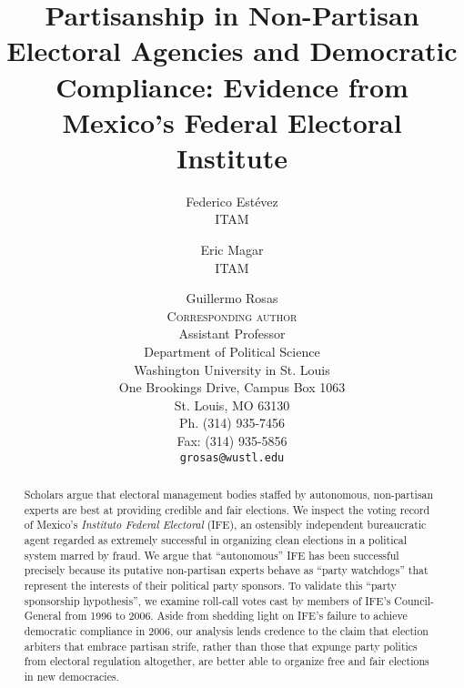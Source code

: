 \documentclass[12 pt, letter]{article}
\begin{document}
\singlespacing
\title{Partisanship in Non-Partisan Electoral Agencies and Democratic Compliance: Evidence from Mexico's Federal Electoral Institute}
\author{Federico Est\'evez\\ITAM
\and Eric Magar\\ITAM \and Guillermo Rosas\\ \textsc{ Corresponding author}\\Assistant Professor\\Department of Political Science\\Washington University in St. Louis\\One Brookings Drive, Campus Box 1063\\St. Louis, MO 63130\\Ph. (314) 935-7456\\Fax: (314) 935-5856\\ \texttt{grosas@wustl.edu}}
\date{}
\maketitle
\begin{abstract}
Scholars argue that electoral management bodies staffed by
autonomous, non-partisan experts are best at providing credible and
fair elections.  We inspect the voting record of Mexico's
\emph{Instituto Federal Electoral} (IFE), an ostensibly independent
bureaucratic agent regarded as extremely successful in organizing
clean elections in a political system marred by fraud.   We argue
that ``autonomous'' IFE has been successful precisely because its
putative non-partisan experts behave as ``party watchdogs'' that
represent the interests of their political party sponsors.  To
validate this ``party sponsorship hypothesis'', we examine roll-call
votes cast by members of IFE's Council-General from 1996 to 2006.
Aside from shedding light on IFE's failure to achieve democratic
compliance in 2006, our analysis lends credence to the claim that
election arbiters that embrace partisan strife, rather than those
that expunge party politics from electoral regulation altogether,
are better able to organize free and fair elections in new
democracies.
\end{abstract}
\vskip 4.5cm
\pagebreak
\doublespace
\end{document}

